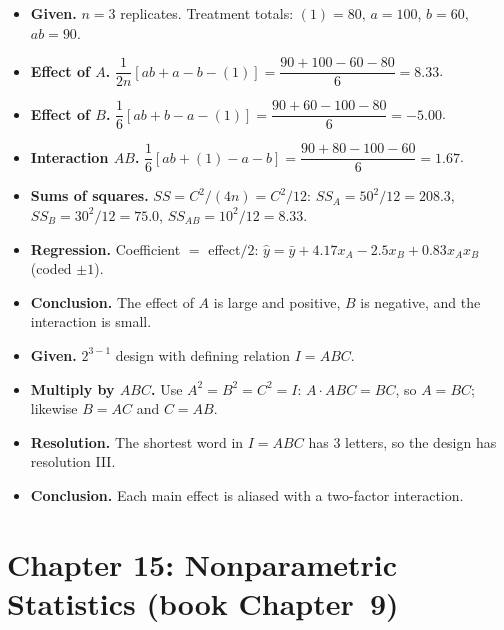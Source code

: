 \begin{example}
\begin{itemize}
  \item \textbf{Given.} $n=3$ replicates. Treatment totals: $(1)=80$, $a=100$, $b=60$, $ab=90$.
  \item \textbf{Effect of $A$.} $\dfrac{1}{2n}[ab+a-b-(1)]=\dfrac{90+100-60-80}{6}=8.33$.
  \item \textbf{Effect of $B$.} $\dfrac{1}{6}[ab+b-a-(1)]=\dfrac{90+60-100-80}{6}=-5.00$.
  \item \textbf{Interaction $AB$.} $\dfrac{1}{6}[ab+(1)-a-b]=\dfrac{90+80-100-60}{6}=1.67$.
  \item \textbf{Sums of squares.} $SS=C^2/(4n)=C^2/12$: $SS_A=50^2/12=208.3$, $SS_B=30^2/12=75.0$, $SS_{AB}=10^2/12=8.33$.
  \item \textbf{Regression.} Coefficient $=$ effect$/2$: $\hat{y}=\bar{y}+4.17x_A-2.5x_B+0.83x_Ax_B$ (coded $\pm1$).
  \item \textbf{Conclusion.} The effect of $A$ is large and positive, $B$ is negative, and the interaction is small.
\end{itemize}
\end{example}

\begin{example}
\begin{itemize}
  \item \textbf{Given.} $2^{3-1}$ design with defining relation $I=ABC$.
  \item \textbf{Multiply by $ABC$.} Use $A^2=B^2=C^2=I$: $A\cdot ABC=BC$, so $A=BC$; likewise $B=AC$ and $C=AB$.
  \item \textbf{Resolution.} The shortest word in $I=ABC$ has $3$ letters, so the design has resolution III.
  \item \textbf{Conclusion.} Each main effect is aliased with a two-factor interaction.
\end{itemize}
\end{example}

\section{Chapter 15: Nonparametric Statistics (book Chapter~9)}

